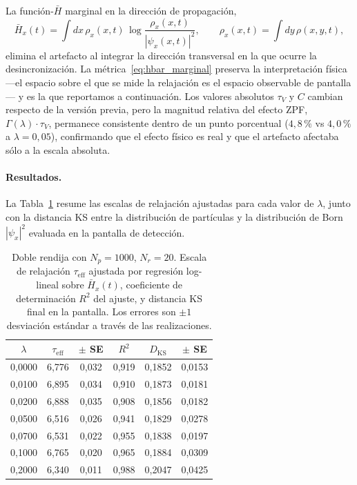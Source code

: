 \documentclass[11pt,a4paper]{article}
\begin{document}
La función-$\bar{H}$ marginal en la dirección de propagación,
\begin{equation}
\bar{H}_x(t)=\int dx\,\rho_x(x,t)\,\log\!
\frac{\rho_x(x,t)}{|\psi_x(x,t)|^2},
\qquad
\rho_x(x,t)=\int dy\,\rho(x,y,t),
\label{eq:hbar_marginal}
\end{equation}
elimina el artefacto al integrar la dirección transversal en la que
ocurre la desincronización. La métrica~\eqref{eq:hbar_marginal} preserva
la interpretación física ---el espacio sobre el que se mide la
relajación es el espacio observable de pantalla--- y es la que
reportamos a continuación. Los valores absolutos $\tau_V$ y $C$ cambian
respecto de la versión previa, pero la magnitud relativa del efecto
ZPF, $\Gamma(\lambda)\cdot\tau_V$, permanece consistente dentro de un
punto porcentual ($4{,}8\,\%$ vs $4{,}0\,\%$ a $\lambda=0{,}05$),
confirmando que el efecto físico es real y que el artefacto afectaba
sólo a la escala absoluta.

\paragraph{Resultados.}
La Tabla~\ref{tab:doble_rendija} resume las escalas de relajación
ajustadas para cada valor de $\lambda$, junto con la distancia KS entre
la distribución de partículas y la distribución de Born $|\psi_x|^2$
evaluada en la pantalla de detección.

\begin{table}[h]
\centering
\caption{Doble rendija con $N_p=1000$, $N_r=20$. Escala de relajación
$\tau_\text{eff}$ ajustada por regresión log-lineal sobre $\bar{H}_x(t)$,
coeficiente de determinación $R^2$ del ajuste, y distancia KS final en
la pantalla. Los errores son $\pm 1$ desviación estándar a través de
las realizaciones.}
\label{tab:doble_rendija}
\begin{tabular}{cccccc}
\toprule
$\lambda$ & $\tau_\text{eff}$ & $\pm$ SE & $R^2$ & $D_\text{KS}$ & $\pm$ SE \\
\midrule
0{,}0000 & 6{,}776 & 0{,}032 & 0{,}919 & 0{,}1852 & 0{,}0153 \\
0{,}0100 & 6{,}895 & 0{,}034 & 0{,}910 & 0{,}1873 & 0{,}0181 \\
0{,}0200 & 6{,}888 & 0{,}035 & 0{,}908 & 0{,}1856 & 0{,}0182 \\
0{,}0500 & 6{,}516 & 0{,}026 & 0{,}941 & 0{,}1829 & 0{,}0278 \\
0{,}0700 & 6{,}531 & 0{,}022 & 0{,}955 & 0{,}1838 & 0{,}0197 \\
0{,}1000 & 6{,}765 & 0{,}020 & 0{,}965 & 0{,}1884 & 0{,}0309 \\
0{,}2000 & 6{,}340 & 0{,}011 & 0{,}988 & 0{,}2047 & 0{,}0425 \\
\bottomrule
\end{tabular}
\end{table}
\end{document}
